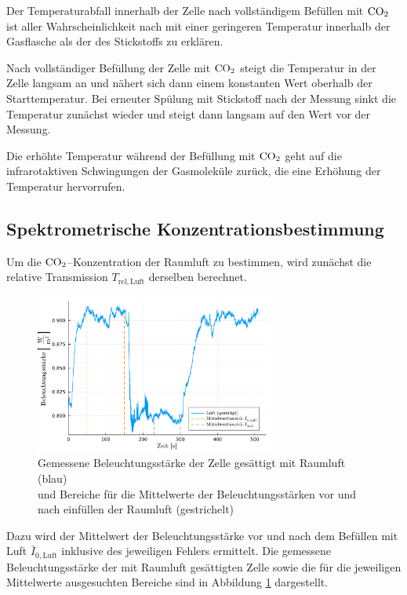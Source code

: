 \documentclass[12pt,a4paper]{scrartcl}
\numberwithin{equation}{section} %
\begin{document}
Der Temperaturabfall innerhalb der Zelle nach vollständigem Befüllen mit $\ce{CO_2}$ ist aller Wahrscheinlichkeit nach mit einer geringeren Temperatur innerhalb der Gasflasche als der des Stickstoffs zu erklären.

Nach vollständiger Befüllung der Zelle mit $\ce{CO_2}$ steigt die Temperatur in der Zelle langsam an und nähert sich dann einem konstanten Wert oberhalb der Starttemperatur. Bei erneuter Spülung mit Stickstoff nach der Messung sinkt die Temperatur zunächst wieder und steigt dann langsam auf den Wert vor der Messung.

Die erhöhte Temperatur während der Befüllung mit $\ce{CO_2}$ geht auf die infrarotaktiven Schwingungen der Gasmoleküle zurück, die eine Erhöhung der Temperatur hervorrufen.

\subsection{Spektrometrische Konzentrationsbestimmung}
\label{Spektrometrische Konzentrationsbestimmung}

Um die $\ce{CO_2}$--Konzentration der Raumluft zu bestimmen, wird zunächst die relative Transmission $T_\mathrm{rel, Luft}$ derselben berechnet.

\begin{figure}[h]
  \centering
  \includegraphics[width=0.7\textwidth]{../media/B1.1/luft.pdf}
  \caption{Gemessene Beleuchtungsstärke der Zelle gesättigt mit Raumluft (blau)\\
    und Bereiche für die Mittelwerte der Beleuchtungsstärken vor und nach einfüllen der Raumluft (gestrichelt)}
  \label{fig:luft}
\end{figure}

Dazu wird der Mittelwert der Beleuchtungsstärke vor und nach dem Befüllen mit Luft $\bar{I}_{0, \mathrm{Luft}}$ inklusive des jeweiligen Fehlers ermittelt. Die gemessene Beleuchtungsstärke der mit Raumluft gesättigten Zelle  sowie die für die jeweiligen Mittelwerte ausgesuchten Bereiche sind in Abbildung \ref{fig:luft} dargestellt.
\end{document}
